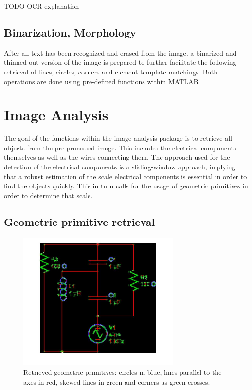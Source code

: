 \documentclass[10pt,twocolumn,letterpaper]{article}
\begin{document}
TODO OCR explanation

\subsection{Binarization, Morphology}
\label{subsec:morph}

After all text has been recognized and erased from the image, a binarized and thinned-out version of the image is prepared to further facilitate the following retrieval of lines, circles, corners and element template matchings. Both operations are done using pre-defined functions within MATLAB.
\par


\section{Image Analysis}
\label{sec:analysis}

The goal of the functions within the image analysis package is to retrieve all objects from the pre-processed image. This includes the electrical components themselves as well as the wires connecting them. The approach used for the detection of the electrical components is a sliding-window approach, implying that a robust estimation of the scale electrical components is essential in order to find the objects quickly. This in turn calls for the usage of geometric primitives in order to determine that scale.

\subsection{Geometric primitive retrieval}
\label{subsec:geom}

\begin{figure}[!ht]
\includegraphics[width = 3.2in]{img/geomprim.jpg}
\caption{Retrieved geometric primitives: circles in blue, lines parallel to the axes in red, skewed lines in green and corners as green crosses.}
\label{fig:c8}
\end{figure}
\par
\end{document}
